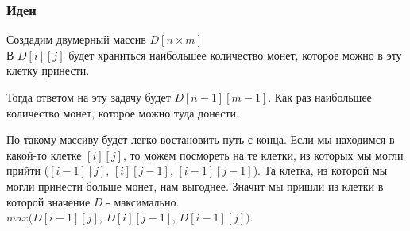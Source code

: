 \documentclass[handout]{beamer}
\begin{document}
\begin{frame}

\end{frame}

\begin{frame}
\transdissolve[duration=0.2]
\frametitle{Идеи}
\begin{block}{}
Создадим двумерный массив $D [n \times m]$\\
В $D[i][j]$ будет храниться наибольшее количество монет, которое можно в эту клетку принести.
\end{block}
\begin{block}{}
Тогда ответом на эту задачу будет $D[n-1][m-1]$. Как раз наибольшее количество монет, которое можно туда донести.
\end{block}
\begin{block}{}
По такому массиву будет легко востановить путь с конца.
Если мы находимся в какой-то клетке $[i][j]$, то можем посмореть на те клетки, из которых мы могли прийти ($[i-1][j]$, $[i][j-1]$, $[i-1][j-1]$). Та клетка, из которой мы могли принести больше монет, нам выгоднее. Значит мы пришли из клетки в которой значение $D$ - максимально.\\
$max(D[i-1][j]$, $D[i][j-1]$, $D[i-1][j])$.
\end{block}

\end{frame}
\end{document}
